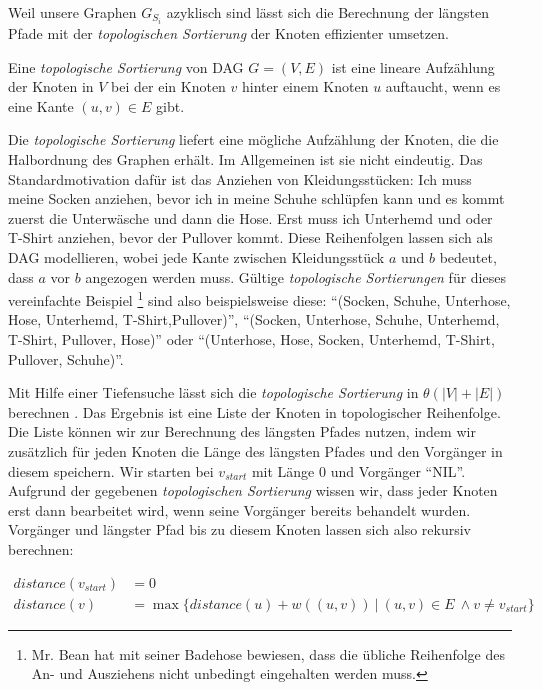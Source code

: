 Weil unsere Graphen $G_{S_i}$ azyklisch sind lässt sich die Berechnung der längsten Pfade mit der \emph{topologischen Sortierung} der Knoten effizienter umsetzen.

\begin{definition}
	Eine \emph{topologische Sortierung} von DAG $G = (V,E)$ ist eine lineare Aufzählung der Knoten in $V$ bei der ein Knoten $v$ hinter einem Knoten $u$ auftaucht, wenn es eine Kante $(u,v)\in E$ gibt.
\end{definition}

Die \emph{topologische Sortierung} liefert eine mögliche Aufzählung der Knoten, die die Halbordnung des Graphen erhält. Im Allgemeinen ist sie nicht eindeutig. Das Standardmotivation dafür ist das Anziehen von Kleidungsstücken: Ich muss meine Socken anziehen, bevor ich in meine Schuhe schlüpfen kann und es kommt zuerst die Unterwäsche und dann die Hose. Erst muss ich Unterhemd und oder T-Shirt anziehen, bevor der Pullover kommt. Diese Reihenfolgen lassen sich als DAG modellieren, wobei jede Kante zwischen Kleidungsstück $a$ und $b$ bedeutet, dass $a$ vor $b$ angezogen werden muss. Gültige \emph{topologische Sortierungen} für dieses vereinfachte Beispiel \footnote{Mr. Bean hat mit seiner Badehose bewiesen, dass die übliche Reihenfolge des An- und Ausziehens nicht unbedingt eingehalten werden muss.} sind also beispielsweise diese: \enquote{(Socken, Schuhe, Unterhose, Hose, Unterhemd, T-Shirt,Pullover)}, \enquote{(Socken, Unterhose, Schuhe, Unterhemd, T-Shirt, Pullover, Hose)} oder \enquote{(Unterhose, Hose, Socken, Unterhemd, T-Shirt, Pullover, Schuhe)}. 

Mit Hilfe einer Tiefensuche lässt sich die \emph{topologische Sortierung} in $\theta(|V| + |E|)$ berechnen \cite{clrs09}. Das Ergebnis ist eine Liste der Knoten in topologischer Reihenfolge. Die Liste können wir zur Berechnung des längsten Pfades nutzen, indem wir zusätzlich für jeden Knoten die Länge des längsten Pfades und den Vorgänger in diesem speichern. Wir starten bei $v_{start}$ mit Länge 0 und Vorgänger \enquote{NIL}. Aufgrund der gegebenen \emph{topologischen Sortierung} wissen wir, dass jeder Knoten erst dann bearbeitet wird, wenn seine Vorgänger bereits behandelt wurden. Vorgänger und längster Pfad bis zu diesem Knoten lassen sich also rekursiv berechnen:

\begin{equation}
\begin{split}
	distance(v_{start}) & = 0 \\
	distance(v)       & = \max\{distance(u) + w((u,v))\:|\:(u,v) \in E\ \wedge v \neq v_{start}\} 
\end{split}
\end{equation} 

